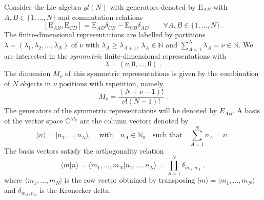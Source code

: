 \documentclass[10pt]{article}
\numberwithin{equation}{section}
\numberwithin{equation}{subsection}
\newcommand{\co}{\;,}
\newcommand{\dt}{\;.}
\newcommand{\EE}{\mathrm{E}}
\newcommand{\twoj}{\nu}
\begin{document}
Consider the Lie algebra ${gl}(N)$ with generators denoted by $\EE_{AB}$ with $A,B\in \{1,\ldots,N\}$ and commutation relations
\begin{equation}\label{eq:comgl}
\left[\EE_{AB},\EE_{CD}\right]=\EE_{AD}\delta_{CB}-\EE_{CB}\delta_{AD}\qquad \forall A,B\in \{1,\ldots,N\}\,.
\end{equation}
The finite-dimensional representations are labelled by partitions $\lambda=(\lambda_1,\lambda_2,\ldots,\lambda_N)$ of $\nu$ with  $\lambda_A\geq \lambda_{A+1}$,  $\lambda_A\in \mathbb{N}$ and $\sum_{A=1}^N \lambda_A = \nu\in\mathbb{N}$.  
We are interested in the {\em symmetric} finite-dimensional representations with 
\begin{equation}\label{eq:dynkin}
    \lambda=(\twoj,0,\ldots,0) \;.
\end{equation} 
The dimension $M_\twoj$ of this symmetric representations is given by the combination of $N$ objects in $\twoj$ positions with repetition, namely
\begin{equation}
	M_\twoj= \frac{(N+\twoj-1)!}{\twoj  !(N-1)!}\dt
\end{equation} 
The generators of the symmetric representations will be denoted by $E_{AB}$.
A basis of the vector space $\mathbb{C}^{M_\twoj}$ are the column vectors denoted by
\begin{equation}
  |n\rangle=  |n_{1},\ldots,n_{N}\rangle,\quad \text{with}\quad n_{A}\in\mathbb{N}_{0}\quad \text{such that}\quad \sum_{A=1}^{N}n_{A}=\nu\,.
\end{equation}
The basis vectors satisfy the orthogonality relation
\begin{equation}\label{ortho}
   \langle m|n \rangle =\langle m_{1},\ldots,m_{N}|n_{1},\ldots,n_{N}\rangle=\prod_{A=1}^{N}\delta_{m_{A},n_{A}}\co
\end{equation}
where  $ \langle m_{1},\ldots,m_{N}|$ is the row vector obtained by transposing $|m\rangle=|m_{1},\ldots,m_{N}\rangle$ and $\delta_{m_{A},n_{A}}$ is the Kronecker delta. 
\end{document}
